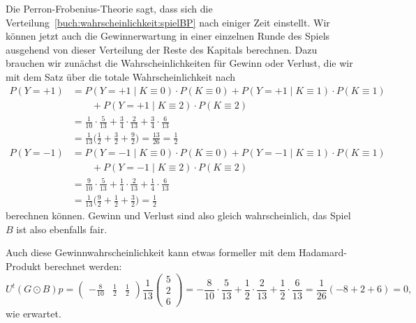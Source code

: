 Die Perron-Frobenius-Theorie sagt, dass sich die
Verteilung~\ref{buch:wahrscheinlichkeit:spielBP} nach einiger Zeit
einstellt.
Wir können jetzt auch die Gewinnerwartung in einer einzelnen 
Runde des Spiels ausgehend von dieser Verteilung der Reste des Kapitals
berechnen.
Dazu brauchen wir zunächst die Wahrscheinlichkeiten für Gewinn oder
Verlust, die wir mit dem Satz über die totale Wahrscheinlichkeit 
nach
\begin{align*}
P(Y=+1)
&=
P(Y=+1\mid K\equiv 0) \cdot P(K\equiv 0)
+
P(Y=+1\mid K\equiv 1) \cdot P(K\equiv 1)
\\
&\qquad
+
P(Y=+1\mid K\equiv 2) \cdot P(K\equiv 2)
\\
&=
\frac{1}{10}\cdot\frac{5}{13}
+
\frac{3}{4} \cdot\frac{2}{13}
+
\frac{3}{4} \cdot\frac{6}{13}
\\
&=
\frac1{13}\biggl(
\frac{1}{2}+\frac{3}{2}+\frac{9}{2}
\biggr)
=
\frac{13}{26}
=
\frac12
\\[8pt]
P(Y=-1)
&=
P(Y=-1\mid K\equiv 0) \cdot P(K\equiv 0)
+
P(Y=-1\mid K\equiv 1) \cdot P(K\equiv 1)
\\
&\qquad
+
P(Y=-1\mid K\equiv 2) \cdot P(K\equiv 2)
\\
&=
\frac{9}{10}\cdot\frac{5}{13}
+
\frac{1}{4} \cdot\frac{2}{13}
+
\frac{1}{4} \cdot\frac{6}{13}
\\
&=
\frac{1}{13}\biggl(
\frac{9}{2} + \frac{1}{2} + \frac{3}{2}
\biggr)
=
\frac{1}{2}
\end{align*}
berechnen können.
Gewinn und Verlust sind also gleich wahrscheinlich, das Spiel $B$ ist also
ebenfalls fair.

Auch diese Gewinnwahrscheinlichkeit kann etwas formeller mit dem
Hadamard-Produkt berechnet werden:
\[
U^t (G\odot B) p
=
\begin{pmatrix}-\frac{8}{10}&\frac12&\frac12\end{pmatrix}
\frac{1}{13}
\begin{pmatrix}
5\\2\\6
\end{pmatrix}
=
-\frac{8}{10}\cdot\frac{5}{13}
+\frac{1}{2} \cdot\frac{2}{13}
+\frac{1}{2} \cdot\frac{6}{13}
=
\frac{1}{26}(-8 + 2+ 6)
=
0,
\]
wie erwartet.

